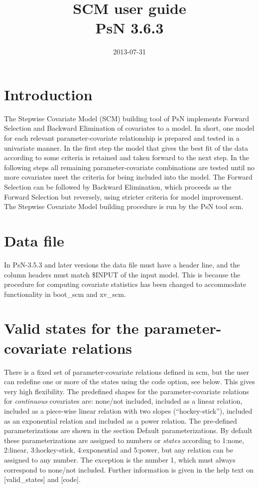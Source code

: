 \documentclass[a4paper,12pt]{article}
\title{SCM user guide\\ \vspace{2 mm} {\large PsN 3.6.3}}
\date{2013-07-31}
\begin{document}
\maketitle


\section{Introduction}

The Stepwise Covariate Model (SCM) building tool of PsN implements Forward Selection and Backward Elimination of covariates to a model. In short, one model for each relevant parameter-covariate relationship is prepared and tested in a univariate manner. In the first step the model that gives the best fit of the data according to some criteria is retained and taken forward to the next step. In the following steps all remaining parameter-covariate combinations are tested until no more covariates meet the criteria for being included into the model. The Forward Selection can be followed by Backward Elimination, which proceeds as the Forward Selection but reversely, using stricter criteria for model improvement. The Stepwise Covariate Model building procedure is run by the PsN tool scm. 

\section{Data file}
In PsN-3.5.3 and later versions the data file must have a header line, and the column headers must match \$INPUT of the input model. This is because the procedure for computing covariate statistics has been changed to accommodate functionality in boot\_scm and xv\_scm. 

\section{Valid states for the parameter-covariate relations}
There is a fixed set of parameter-covariate relations defined in scm, but the user can redefine one or more of the states using the code option, see below. This gives very high flexibility. The predefined shapes for the parameter-covariate relations for \emph{continuous} covariates are: none/not included, included as a linear relation, included as a piece-wise linear relation with two slopes (“hockey-stick”), included as an exponential relation and included as a power relation. The pre-defined parameterizations are shown in the section Default parameterizations. By default these parameterizations are assigned to numbers or \emph{states} according to 1:none,  2:linear, 3:hockey-stick, 4:exponential and 5:power, but any relation can be assigned to any number. The exception is the number 1, which must always correspond to none/not included. Further information is given in the help text on [valid\_states] and [code]. 
\end{document}
